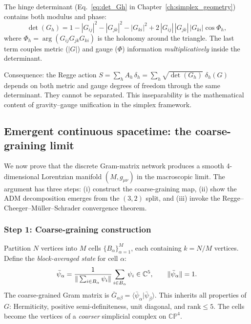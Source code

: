 The hinge determinant (Eq.~\ref{eq:det_Gh} in Chapter~\ref{ch:simplex_geometry}) contains both modulus and phase:
\begin{equation}
\det(G_h) = 1 - |G_{ij}|^2 - |G_{jk}|^2 - |G_{ki}|^2 + 2\,|G_{ij}|\,|G_{jk}|\,|G_{ki}|\cos\Phi_h,
\end{equation}
where $\Phi_h = \arg(G_{ij} G_{jk} G_{ki})$ is the holonomy around the triangle.  The last term couples metric ($|G|$) and gauge ($\Phi$) information \emph{multiplicatively} inside the determinant.

Consequence: the Regge action $S = \sum_h A_h\,\delta_h = \sum_h \sqrt{\det(G_h)}\;\delta_h(G)$ depends on both metric and gauge degrees of freedom through the same determinant.  They cannot be separated.  This inseparability is the mathematical content of gravity--gauge unification in the simplex framework.

\subsection{Emergent continuous spacetime: the coarse-graining limit}
\label{sec:emergent_spacetime}

We now prove that the discrete Gram-matrix network produces a smooth 4-dimensional Lorentzian manifold $(M, g_{\mu\nu})$ in the macroscopic limit.  The argument has three steps: (i) construct the coarse-graining map, (ii) show the ADM decomposition emerges from the $(3,2)$ split, and (iii) invoke the Regge--Cheeger--M\"uller--Schrader convergence theorem.

\subsubsection{Step 1: Coarse-graining construction}

Partition $N$ vertices into $M$ cells $\{B_\alpha\}_{\alpha=1}^M$, each containing $k = N/M$ vertices.  Define the \emph{block-averaged state} for cell $\alpha$:
\begin{equation}
\bar{\psi}_\alpha = \frac{1}{\|\sum_{i \in B_\alpha}\psi_i\|}\sum_{i \in B_\alpha}\psi_i \in \mathbb{C}^5, \qquad \|\bar{\psi}_\alpha\| = 1.
\end{equation}
The coarse-grained Gram matrix is $\bar{G}_{\alpha\beta} = \langle\bar{\psi}_\alpha|\bar{\psi}_\beta\rangle$.  This inherits all properties of $G$: Hermiticity, positive semi-definiteness, unit diagonal, and $\mathrm{rank} \le 5$.  The cells become the vertices of a \emph{coarser} simplicial complex on $\mathbb{CP}^4$.

